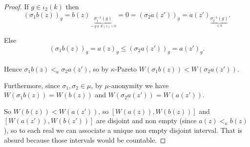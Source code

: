 \documentclass{article}
\begin{document}
\begin{proof}
  If $g\in \iota_2(k)$ then
  \[(\sigma_1 b(z))_g=b(z)_{\underset{=g \notin E(z)\cup k}
  {\underbrace{\sigma_1^{-1}(g)}}}=0=(\sigma_2 a(z'))_g=a(z')_{\underset{\in k}
  {\underbrace{\sigma_2^{-1}(g)}}}.\]

  Else
  \[(\sigma_1 b(z))_g=a(z)_g\leq (\sigma_2 a(z'))_g=a(z')_g.\] \\

  Hence $\sigma_1b(z)<_\kappa \sigma_2a(z')$, so by $\kappa$-Pareto
  $W(\sigma_1b(z))<W(\sigma_2a(z'))$.

  Furthermore, since $\sigma_1,\sigma_2\in\mu$, by $\mu$-anonymity we have
  $W(\sigma_1b(z))=W(b(z))$ and $W(\sigma_2a(z'))=W(a(z'))$.

  So $W(b(z))<W(a(z'))$, so $[W(a(z)),W(b(z))]$ and $[W(a(z')),W(b(z'))]$
  are disjoint and non empty (since $a(z)<_\kappa b(z)$), so to each real
  we can associate a unique non empty disjoint interval. That is absurd because
  those intervals would be countable.

\end{proof}





\end{document}
